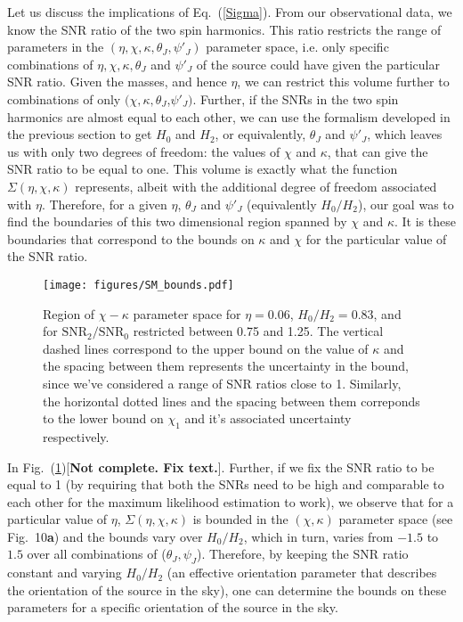 \documentclass[preprint,onecolumn,,tightenlines,superscriptaddress,showpacs,nofootinbib,eqsecnum,amsfonts,amsmath]{revtex4}
\begin{document}
Let us discuss the implications of Eq.~(\ref{Sigma}). From our observational
data, we know the SNR ratio of the two spin harmonics. This ratio restricts the
range of parameters in the $(\eta, \chi, \kappa, \theta_J, \psi'_J)$ parameter
space, i.e. only specific combinations of  $\eta, \chi, \kappa, \theta_J$ and
$\psi'_J$ of the source could  have given the particular SNR ratio. Given the
masses, and hence $\eta$, we can restrict this volume further to combinations of
only $(\chi, \kappa, \theta_J$,$\psi'_J)$. Further, if the SNRs in the two spin
harmonics are almost equal to each other, we can use the formalism developed in
the previous section to get $H_{0}$ and $H_{2}$, or equivalently, $\theta_J$ and
$\psi'_J$, which leaves us with only two degrees of freedom: the values of $\chi$ and
$\kappa$, that can give the SNR ratio to be equal to one. This volume is exactly what the
function $\Sigma(\eta, \chi, \kappa)$ represents, albeit with the additional degree of freedom 
associated with $\eta$. Therefore, for a given $\eta$, $\theta_J$ and $\psi'_J$ (equivalently $H_{0}/H_{2}$), our goal 
was to find the boundaries of this two dimensional region spanned by $\chi$ and $\kappa$. It is these boundaries 
that correspond to the bounds on $\kappa$ and $\chi$ for the particular value of the SNR ratio.\\

\begin{figure}[!htbp] \centering
\texttt{[image: figures/SM\_bounds.pdf]} 
\caption{Region of $\chi-\kappa$ parameter space for $\eta=0.06$,
$H_{0}/H_{2}=0.83$, and for $\text{SNR}_2/\text{SNR}_0$  restricted between 0.75
and 1.25. The vertical dashed lines correspond to the upper bound on the value
of $\kappa$ and the spacing between them represents the uncertainty in the
bound, since we've considered a range of SNR ratios close to 1.  Similarly, the
horizontal dotted lines and the spacing between them correponds to the lower bound on
$\chi_{1}$ and it's associated uncertainty respectively.}
\label{chi--kappa_region}
\end{figure}

In Fig.~(\ref{chi--kappa_region})[\textbf{Not complete. Fix text.}]. Further, if we fix the SNR ratio to be equal to 1 (by requiring that both the
SNRs need to be high and comparable to each other for the maximum likelihood
estimation to work), we observe that for a particular value of $\eta$,
$\Sigma(\eta, \chi, \kappa)$ is bounded in the $(\chi, \kappa)$ parameter
space (see Fig.~10\textbf{a}) and the bounds vary over 
$H_{0}/H_{2}$, which in turn, varies from $-1.5$ to $1.5$ over all
combinations of ($\theta_J, \psi_J$). Therefore, by keeping the SNR ratio
constant and varying $H_{0}/H_{2}$ (an effective
orientation parameter that describes the orientation of the
source in the sky), one can determine the bounds on these parameters for a 
specific orientation of the source in the sky.
\end{document}
